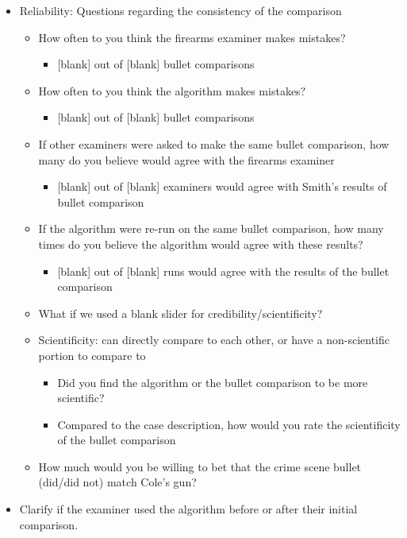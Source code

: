 \documentclass[print]{nuthesis}
\providecommand{\tightlist}{%
  \setlength{\itemsep}{0pt}\setlength{\parskip}{0pt}}
\begin{document}
\begin{itemize}
\tightlist
\item
  Reliability: Questions regarding the consistency of the comparison

  \begin{itemize}
  \tightlist
  \item
    How often to you think the firearms examiner makes mistakes?

    \begin{itemize}
    \tightlist
    \item
      {[}blank{]} out of {[}blank{]} bullet comparisons
    \end{itemize}
  \item
    How often to you think the algorithm makes mistakes?

    \begin{itemize}
    \tightlist
    \item
      {[}blank{]} out of {[}blank{]} bullet comparisons
    \end{itemize}
  \item
    If other examiners were asked to make the same bullet comparison, how many do you believe would agree with the firearms examiner

    \begin{itemize}
    \tightlist
    \item
      {[}blank{]} out of {[}blank{]} examiners would agree with Smith's results of bullet comparison
    \end{itemize}
  \item
    If the algorithm were re-run on the same bullet comparison, how many times do you believe the algorithm would agree with these results?

    \begin{itemize}
    \tightlist
    \item
      {[}blank{]} out of {[}blank{]} runs would agree with the results of the bullet comparison
    \end{itemize}
  \item
    What if we used a blank slider for credibility/scientificity?
  \item
    Scientificity: can directly compare to each other, or have a non-scientific portion to compare to

    \begin{itemize}
    \tightlist
    \item
      Did you find the algorithm or the bullet comparison to be more scientific?
    \item
      Compared to the case description, how would you rate the scientificity of the bullet comparison
    \end{itemize}
  \item
    How much would you be willing to bet that the crime scene bullet (did/did not) match Cole's gun?
  \end{itemize}
\item
  Clarify if the examiner used the algorithm before or after their initial comparison.
\end{itemize}
\end{document}
